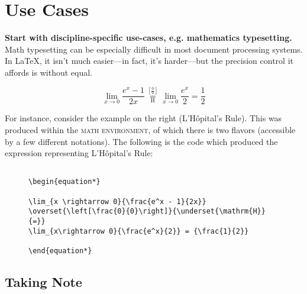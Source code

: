 \documentclass[justified]{tufte-handout}
\begin{document}
\section{Use Cases}

\textbf{Start with discipline-specific use-cases, e.g. mathematics typesetting.}\\

Math typesetting can be especially difficult in most document processing systems. In \LaTeX, it isn't much easier---in fact, it's harder---but the precision control it affords is without equal.

\begin{marginfigure}%
  \begin{minipage}[t]{1.0\textwidth}
\begin{equation*}
 \lim_{ x \rightarrow 0 }{ \frac{e^x - 1} {2x} }
 \overset{ \left[ \frac{0}{0} \right] }{\underset{ \mathrm{H}}{=} }
 \lim_{ x \rightarrow 0 }{ \frac{e^x}{2} } = { \frac{1}{2} }
\end{equation*}
  \end{minipage}
\end{marginfigure}

For instance, consider the example on the right (L'H\^{o}pital's Rule). This was produced within the \textsc{math environment}, of which there is two flavors (accessible by a few different notations). The following is the code which produced the expression representing L'H\^{o}pital's Rule:

\begin{figure}
\begin{shaded}
\begin{Verbatim}

\begin{equation*}

\lim_{x \rightarrow 0}{\frac{e^x - 1}{2x}}
\overset{\left[\frac{0}{0}\right]}{\underset{\mathrm{H}}{=}}
\lim_{x\rightarrow 0}{\frac{e^x}{2}} = {\frac{1}{2}}

\end{equation*}
\end{Verbatim}
\end{shaded}
\end{figure}


\subsection{Taking Note}
\end{document}
